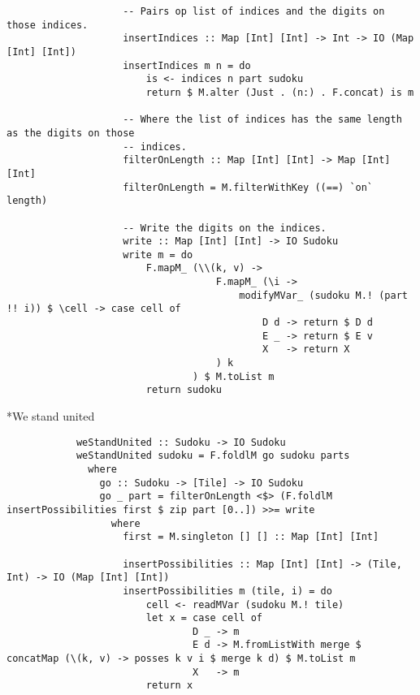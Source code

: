 \documentclass[a4paper,12pt]{article}
\begin{document}
\begin{section}
\begin{subsection}
\begin{subsubsection}
\begin{lstlisting}
                    -- Pairs op list of indices and the digits on those indices.
                    insertIndices :: Map [Int] [Int] -> Int -> IO (Map [Int] [Int])
                    insertIndices m n = do
                        is <- indices n part sudoku
                        return $ M.alter (Just . (n:) . F.concat) is m

                    -- Where the list of indices has the same length as the digits on those
                    -- indices.
                    filterOnLength :: Map [Int] [Int] -> Map [Int] [Int]
                    filterOnLength = M.filterWithKey ((==) `on` length)

                    -- Write the digits on the indices.
                    write :: Map [Int] [Int] -> IO Sudoku
                    write m = do
                        F.mapM_ (\\(k, v) ->
                                    F.mapM_ (\i ->
                                        modifyMVar_ (sudoku M.! (part !! i)) $ \cell -> case cell of
                                            D d -> return $ D d
                                            E _ -> return $ E v
                                            X   -> return X
                                    ) k
                                ) $ M.toList m
                        return sudoku
            \end{lstlisting}

        \end{subsubsection}


        \begin{subsubsection}*{We stand united}

            \begin{lstlisting}
            weStandUnited :: Sudoku -> IO Sudoku
            weStandUnited sudoku = F.foldlM go sudoku parts
              where
                go :: Sudoku -> [Tile] -> IO Sudoku
                go _ part = filterOnLength <$> (F.foldlM insertPossibilities first $ zip part [0..]) >>= write
                  where
                    first = M.singleton [] [] :: Map [Int] [Int]

                    insertPossibilities :: Map [Int] [Int] -> (Tile, Int) -> IO (Map [Int] [Int])
                    insertPossibilities m (tile, i) = do
                        cell <- readMVar (sudoku M.! tile)
                        let x = case cell of
                                D _ -> m
                                E d -> M.fromListWith merge $ concatMap (\(k, v) -> posses k v i $ merge k d) $ M.toList m
                                X   -> m
                        return x


\end{lstlisting}
\end{subsubsection}
\end{subsection}
\end{section}
\end{document}
